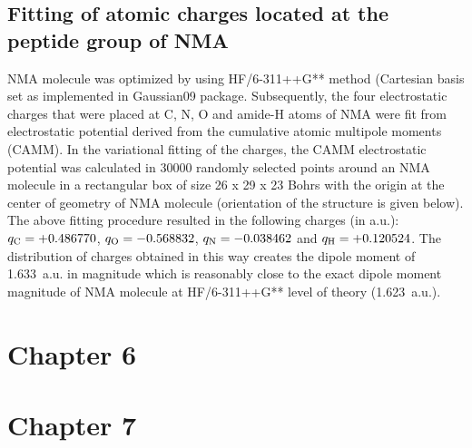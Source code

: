 \documentclass[a4paper,titlepage,twoside,fleqn,12pt]{book}
\begin{document}
\begin{appendices}
\begin{refsection}
\subsection{Fitting of atomic charges located at the peptide group of NMA\label{a:nma-esp-fit}}

NMA molecule was optimized by using HF/6-311++G** method (Cartesian basis set
as implemented in {\sc Gaussian09} package. Subsequently, the four
electrostatic charges that were placed at C, N, O and amide-H atoms of NMA were fit from
electrostatic potential derived from the cumulative atomic multipole moments (CAMM). In
the variational fitting of the charges, the CAMM electrostatic potential was calculated in
30000 randomly selected points around an NMA molecule in a rectangular box of size 
26 x 29 x 23 Bohrs with the origin at the center of geometry of NMA molecule (orientation of the
structure is given below). The above fitting procedure resulted in the following charges (in
a.u.): $q_{\rm C}=+0.486770$, $q_{\rm O}=-0.568832$, $q_{\rm N}=-0.038462$ and 
$q_{\rm H}=+0.120524$. The distribution of
charges obtained in this way creates the dipole moment of 1.633~a.u. in magnitude which is
reasonably close to the exact dipole moment magnitude of NMA molecule at 
HF/6-311++G** level of theory (1.623~a.u.).

\section{Chapter 6}

\section{Chapter 7}


\end{refsection}
\end{appendices}
\end{document}
